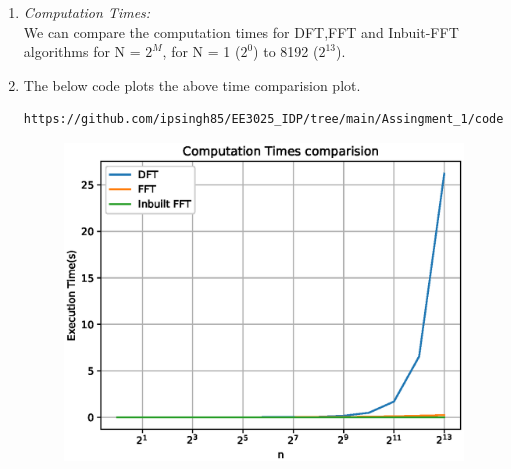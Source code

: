 \documentclass[journal,12pt,twocolumn]{IEEEtran}
\renewcommand\thesection{\arabic{section}}
\begin{document}
\begin{enumerate}[label=\thesection.\arabic*.,ref=\thesection.\theenumi]
\item \emph{Computation Times:} \\
We can compare the computation times for DFT,FFT and Inbuit-FFT algorithms for N = $2^{M}$, for N = 1 ($2^{0}$) to 8192 ($2^{13}$).
\item The below code plots the above time comparision plot.
\begin{lstlisting}
https://github.com/ipsingh85/EE3025_IDP/tree/main/Assingment_1/codes/ee18btech11020_2.py
\end{lstlisting}
\begin{figure}[!ht]
	\includegraphics[width=1.15\columnwidth]{./figs/Figure_2.eps}
\end{figure}


\end{enumerate}
\end{document}
